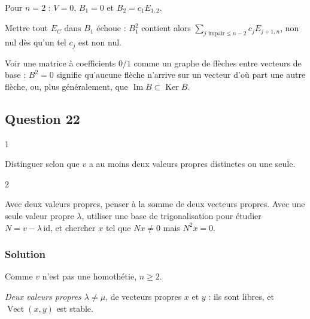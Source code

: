 \documentclass[11pt,a4paper]{article}
\begin{document}
Pour \(n=2\) : \(V=0\), \(B_1=0\) et \(B_2=c_1E_{1,2}\).

\begin{piege}

Mettre tout \(E_C\) dans \(B_1\) échoue : \(B_1^2\) contient alors \(\sum_{j\text{ impair}\le n-2}c_jE_{j+1,n}\), non nul dès qu'un tel \(c_j\) est non nul.

\end{piege}

\begin{methode}

Voir une matrice à coefficients \(0/1\) comme un graphe de flèches entre vecteurs de base : \(B^2=0\) signifie qu'aucune flèche n'arrive sur un vecteur d'où part une autre flèche, ou, plus généralement, que \(\operatorname{Im}B\subset\operatorname{Ker}B\).

\end{methode}

\hypertarget{question-22}{%
\subsection{Question 22}\label{question-22}}

\begin{indication}{1}

Distinguer selon que \(v\) a au moins deux valeurs propres distinctes ou une seule.

\end{indication}

\begin{indication}{2}

Avec deux valeurs propres, penser à la somme de deux vecteurs propres. Avec une seule valeur propre \(\lambda\), utiliser une base de trigonalisation pour étudier \(N=v-\lambda\,\mathrm{id}\), et chercher \(x\) tel que \(Nx\neq0\) mais \(N^2x=0\).

\end{indication}

\hypertarget{solution-21}{%
\subsubsection{Solution}\label{solution-21}}

Comme \(v\) n'est pas une homothétie, \(n\ge2\).

\emph{Deux valeurs propres \(\lambda\neq\mu\)}, de vecteurs propres \(x\) et \(y\) : ils sont libres, et \(\operatorname{Vect}(x,y)\) est stable.
\end{document}
